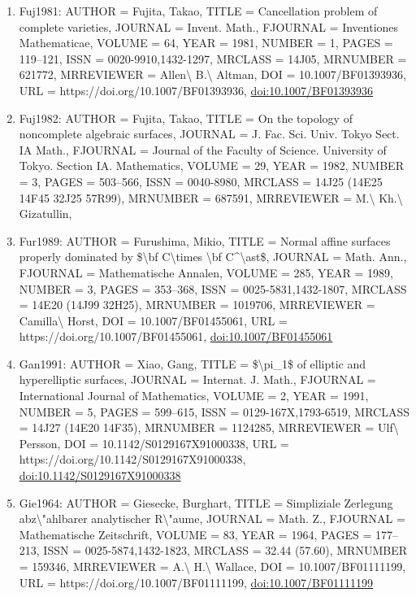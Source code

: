 \documentclass[11pt]{article}
\begin{document}
\begin{enumerate}[leftmargin=*]
  \item Fuj1981: AUTHOR = Fujita, Takao, TITLE = Cancellation problem of complete varieties, JOURNAL = Invent. Math., FJOURNAL = Inventiones Mathematicae, VOLUME = 64, YEAR = 1981, NUMBER = 1, PAGES = 119--121, ISSN = 0020-9910,1432-1297, MRCLASS = 14J05, MRNUMBER = 621772, MRREVIEWER = Allen\textbackslash{} B.\textbackslash{} Altman, DOI = 10.1007/BF01393936, URL = https://doi.org/10.1007/BF01393936, \href{https://doi.org/10.1007/BF01393936}{doi:10.1007/BF01393936}
  \item Fuj1982: AUTHOR = Fujita, Takao, TITLE = On the topology of noncomplete algebraic surfaces, JOURNAL = J. Fac. Sci. Univ. Tokyo Sect. IA Math., FJOURNAL = Journal of the Faculty of Science. University of Tokyo. Section IA. Mathematics, VOLUME = 29, YEAR = 1982, NUMBER = 3, PAGES = 503--566, ISSN = 0040-8980, MRCLASS = 14J25 (14E25 14F45 32J25 57R99), MRNUMBER = 687591, MRREVIEWER = M.\textbackslash{} Kh.\textbackslash{} Gizatullin,
  \item Fur1989: AUTHOR = Furushima, Mikio, TITLE = Normal affine surfaces properly dominated by \$\textbackslash{}bf C\textbackslash{}times \textbackslash{}bf C\^{}\textbackslash{}ast\$, JOURNAL = Math. Ann., FJOURNAL = Mathematische Annalen, VOLUME = 285, YEAR = 1989, NUMBER = 3, PAGES = 353--368, ISSN = 0025-5831,1432-1807, MRCLASS = 14E20 (14J99 32H25), MRNUMBER = 1019706, MRREVIEWER = Camilla\textbackslash{} Horst, DOI = 10.1007/BF01455061, URL = https://doi.org/10.1007/BF01455061, \href{https://doi.org/10.1007/BF01455061}{doi:10.1007/BF01455061}
  \item Gan1991: AUTHOR = Xiao, Gang, TITLE = \$\textbackslash{}pi\_1\$ of elliptic and hyperelliptic surfaces, JOURNAL = Internat. J. Math., FJOURNAL = International Journal of Mathematics, VOLUME = 2, YEAR = 1991, NUMBER = 5, PAGES = 599--615, ISSN = 0129-167X,1793-6519, MRCLASS = 14J27 (14E20 14F35), MRNUMBER = 1124285, MRREVIEWER = Ulf\textbackslash{} Persson, DOI = 10.1142/S0129167X91000338, URL = https://doi.org/10.1142/S0129167X91000338, \href{https://doi.org/10.1142/S0129167X91000338}{doi:10.1142/S0129167X91000338}
  \item Gie1964: AUTHOR = Giesecke, Burghart, TITLE = Simpliziale Zerlegung abz\textbackslash{}"ahlbarer analytischer R\textbackslash{}"aume, JOURNAL = Math. Z., FJOURNAL = Mathematische Zeitschrift, VOLUME = 83, YEAR = 1964, PAGES = 177--213, ISSN = 0025-5874,1432-1823, MRCLASS = 32.44 (57.60), MRNUMBER = 159346, MRREVIEWER = A.\textbackslash{} H.\textbackslash{} Wallace, DOI = 10.1007/BF01111199, URL = https://doi.org/10.1007/BF01111199, \href{https://doi.org/10.1007/BF01111199}{doi:10.1007/BF01111199}

\end{enumerate}
\end{document}
